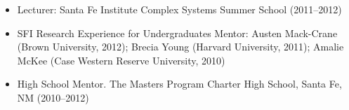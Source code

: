 \documentclass[11pt]{article}
\begin{document}
\begin{itemize}
\begin{itemize}
    \item Lecturer: Santa Fe Institute Complex Systems Summer School (2011--2012)
    \item SFI Research Experience for Undergraduates Mentor: Austen Mack-Crane (Brown University, 2012); Brecia Young (Harvard University, 2011); 
      Amalie McKee (Case Western Reserve University, 2010)
    \item High School Mentor. The Masters Program Charter High School, Santa Fe, NM (2010--2012)
    \end{itemize}
  \end{itemize}
  
\end{document}

